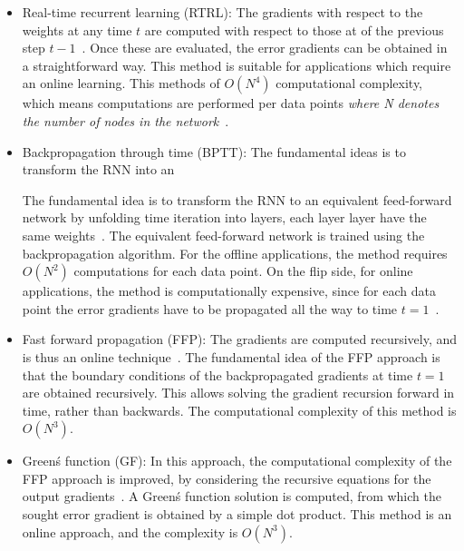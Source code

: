 \documentclass{WitsPhysicsReport}
\begin{document}
\begin{itemize}
\item Real-time recurrent learning (RTRL): The gradients with respect to the weights at any time $t$ are computed with respect to those at of the previous step $t-1$~\cite{atiya2000new}. Once these are evaluated, the error gradients can be obtained in a straightforward way. This method is suitable for applications which require an online learning. This methods of $O(N^{4})$ computational complexity, which means computations are performed per data points \textit{where N denotes the number of nodes in the network}~\cite{Williams:1989:LAC:1351124.1351135}.


\item  Backpropagation through time (BPTT): The fundamental ideas is to transform the RNN into an

The fundamental idea is to transform the RNN to an equivalent feed-forward network by unfolding time iteration into layers, each layer layer have the same weights~\cite{werbos1990backpropagation}. The equivalent feed-forward network is trained using the backpropagation algorithm. For the offline applications, the method requires $O(N^{2})$ computations for each data point. On the flip side, for online applications, the method is computationally expensive, since for each data point the error gradients have to be propagated all the
way to time $t=1$~\cite{Rumelhart:1986:LIR:104279.104293}.

\item Fast forward propagation (FFP): The gradients are computed recursively, and is thus an online technique~\cite{toomarian1991adjoint,toomarian1992learning}. The fundamental idea of the FFP approach is that the boundary conditions of the backpropagated gradients at time $t=1$ are obtained recursively. This allows solving the gradient recursion forward in time, rather than backwards. The computational complexity of this method is $O(N^{3})$.

\item Green\'s function (GF): In this approach, the computational complexity of the FFP approach is improved, by considering the recursive equations for the output gradients~\cite{sun1992green}. A Green\'s function solution is computed, from which the sought error gradient is obtained by a simple dot product. This method is an online approach, and the complexity is $O(N^{3})$.


\end{itemize}
\end{document}
